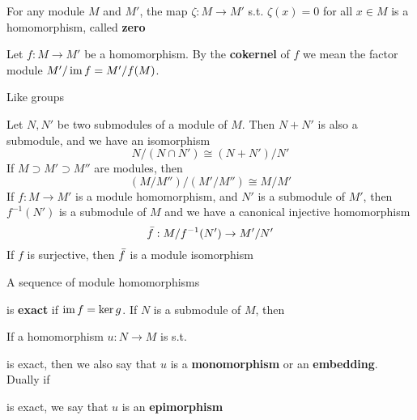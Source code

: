 \documentclass[11pt]{article}
\begin{document}
For any module \(M\) and \(M'\), the map \(\zeta:M\to M'\) s.t.
\(\zeta(x)=0\) for all \(x\in M\) is a homomorphism, called \textbf{zero}

Let \(f:M\to M'\) be a homomorphism. By the \textbf{cokernel} of \(f\) we mean the factor module
\(M'/\operatorname{im} f=M'/f(M)\).

Like groups
\begin{proposition}[]
Let \(N,N'\) be two submodules of a module of \(M\). Then \(N+N'\) is also a submodule, and we
have an isomorphism
\begin{equation*}
N/(N\cap N')\cong(N+N')/N'
\end{equation*}
If \(M\supset M'\supset M''\) are modules, then
\begin{equation*}
(M/M'')/(M'/M'')\cong M/M'
\end{equation*}
If \(f:M\to M'\) is a module homomorphism, and \(N'\) is a submodule of \(M'\), then \(f^{-1}(N')\)
is a submodule of \(M\) and we have a canonical injective homomorphism
\begin{equation*}
\bar{f}:M/f^{-1}(N')\to M'/N'
\end{equation*}
If \(f\) is surjective, then \(\bar{f}\) is a module isomorphism
\end{proposition}

A sequence of module homomorphisms
\begin{center}\end{center}
is \textbf{exact} if \(\operatorname{im} f=\ker g\). If \(N\) is a submodule of \(M\), then
\begin{center}\end{center}

If a homomorphism \(u:N\to M\) is s.t.
\begin{center}\end{center}

is exact, then we also say that \(u\) is a \textbf{monomorphism} or an \textbf{embedding}. Dually
if
\begin{center}\end{center}
is exact, we say that \(u\) is an \textbf{epimorphism}
\end{document}
